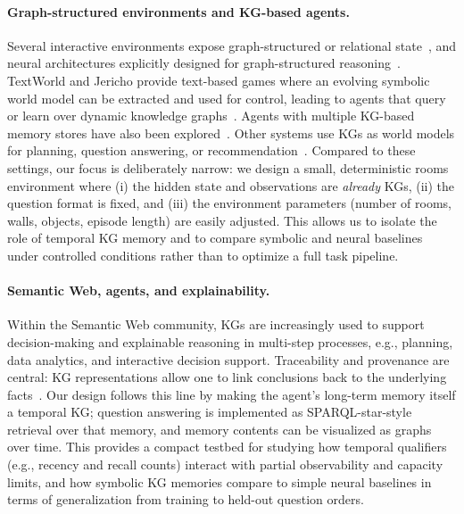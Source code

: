 \documentclass[runningheads]{llncs}
\begin{document}
\paragraph{Graph-structured environments and KG-based agents.}
Several interactive environments expose graph-structured or relational state~\cite{chaplot2020neuraltopologicalslamvisual}, and neural architectures explicitly designed for graph-structured reasoning~\cite{yun2020graphtransformernetworks}.
TextWorld and Jericho provide text-based games where an evolving symbolic world
model can be extracted and used for control, leading to agents that query or learn
over dynamic knowledge graphs~\cite{Cote2018TextWorld,Hausknecht2020Jericho,Ammanabrolu2020Graph,oh2017valuepredictionnetwork}. Agents with multiple KG-based memory stores have also been explored~\cite{10.1609/aaai.v37i1.25075}. Other systems use KGs as world models for planning, question answering, or recommendation~\cite{Hogan_2021,ehrlinger2016towards,bordes2015largescalesimplequestionanswering,yih-etal-2015-semantic}. Compared to these settings, our focus is deliberately narrow: we design a small, deterministic rooms environment where (i) the hidden state and observations are \emph{already} KGs, (ii) the question format is fixed, and (iii) the environment parameters (number of rooms, walls, objects, episode length) are easily adjusted. This allows us to isolate the role of temporal KG memory and to compare symbolic and neural baselines under controlled conditions rather than to optimize a full
task pipeline.

\paragraph{Semantic Web, agents, and explainability.}
Within the Semantic Web community, KGs are increasingly used to support
decision-making and explainable reasoning in multi-step processes, e.g., planning, data analytics, and interactive decision support.
Traceability and provenance are central: KG representations allow one to link
conclusions back to the underlying facts~\cite{10.1145/775152.775249}. Our design follows this line by making the agent’s long-term memory itself a temporal KG; question answering is implemented as SPARQL-star-style retrieval over that memory, and memory contents can be
visualized as graphs over time. This provides a compact testbed for studying how
temporal qualifiers (e.g., recency and recall counts) interact with partial
observability and capacity limits, and how symbolic KG memories compare to simple neural baselines in terms of generalization from training to held-out question orders.
\end{document}

